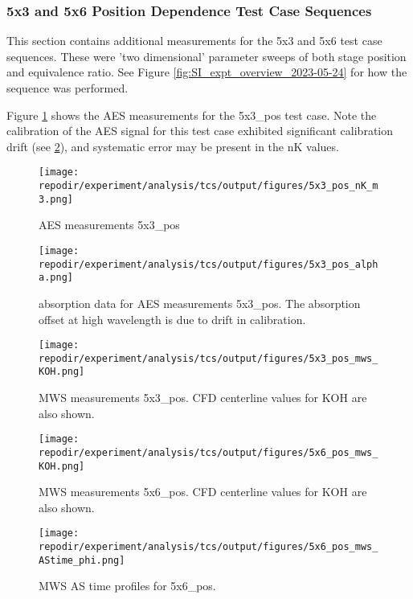 \subsubsection{5x3 and 5x6 Position Dependence Test Case Sequences}

This section contains additional measurements for the 5x3 and 5x6 test case sequences. These were 'two dimensional' parameter sweeps of both stage position and equivalence ratio. See Figure \ref{fig:SI_expt_overview_2023-05-24} for how the sequence was performed. 

Figure \ref{fig:SI_5x3_pos_nK_m3} shows the AES measurements for the 5x3\_pos test case. Note the calibration of the AES signal for this test case exhibited significant calibration drift (see \ref{fig:SI_5x3_pos_alpha}), and systematic error may be present in the nK values. 

\begin{figure}[]
\centering
\texttt{[image: \\repodir/experiment/analysis/tcs/output/figures/5x3\_pos\_nK\_m3.png]}
\caption{AES measurements 5x3\_pos}
\label{fig:SI_5x3_pos_nK_m3}
\end{figure}

\begin{figure}[]
\centering
\texttt{[image: \\repodir/experiment/analysis/tcs/output/figures/5x3\_pos\_alpha.png]}
\caption{absorption data for AES measurements 5x3\_pos. The absorption offset at high wavelength is due to drift in calibration.}
\label{fig:SI_5x3_pos_alpha}
\end{figure}


\begin{figure}[]
\centering
\texttt{[image: \\repodir/experiment/analysis/tcs/output/figures/5x3\_pos\_mws\_KOH.png]}
\caption{MWS measurements 5x3\_pos. CFD centerline values for KOH are also shown.}
\label{fig:SI_5x3_pos_mws_KOH}
\end{figure}


\begin{figure}[]
\centering
\texttt{[image: \\repodir/experiment/analysis/tcs/output/figures/5x6\_pos\_mws\_KOH.png]}
\caption{MWS measurements 5x6\_pos. CFD centerline values for KOH are also shown.}
\label{fig:SI_5x6_pos_mws_KOH}
\end{figure}


\begin{figure}[]
\centering
\texttt{[image: \\repodir/experiment/analysis/tcs/output/figures/5x6\_pos\_mws\_AStime\_phi.png]}
\caption{MWS AS time profiles for 5x6\_pos.}
\label{fig:SI_5x6_pos_mws_AStime_phi}
\end{figure}


